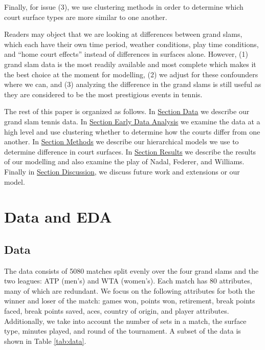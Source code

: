 \documentclass[]{article}
\begin{document}
Finally, for issue (3), we use clustering methods in order to determine
which court surface types are more similar to one another.

Readers may object that we are looking at differences between grand
slams, which each have their own time period, weather conditions, play
time conditions, and ``home court effects'' instead of differences in
surfaces alone. However, (1) grand slam data is the most readily
available and most complete which makes it the best choice at the moment
for modelling, (2) we adjust for these confounders where we can, and (3)
analyzing the difference in the grand slams is still useful as they are
considered to be the most prestigious events in tennis.

The rest of this paper is organized as follows. In
\protect\hyperlink{sec:data}{Section Data} we describe our grand slam
tennis data. In \protect\hyperlink{sec:eda}{Section Early Data Analysis}
we examine the data at a high level and use clustering whether to
determine how the courts differ from one another. In
\protect\hyperlink{sec:methods}{Section Methods} we describe our
hierarchical models we use to determine difference in court surfaces. In
\protect\hyperlink{sec:results}{Section Results} we describe the results
of our modelling and also examine the play of Nadal, Federer, and
Williams. Finally in \protect\hyperlink{discussion}{Section Discussion},
we discuss future work and extensions or our model.

\hypertarget{sec:data-eda}{%
\section{Data and EDA}\label{sec:data-eda}}

\hypertarget{sec:data}{%
\subsection{Data}\label{sec:data}}

The data consists of 5080 matches split evenly over the four grand slams
and the two leagues: ATP (men's) and WTA (women's). Each match has 80
attributes, many of which are redundant. We focus on the following
attributes for both the winner and loser of the match: games won, points
won, retirement, break points faced, break points saved, aces, country
of origin, and player attributes. Additionally, we take into account the
number of sets in a match, the surface type, minutes played, and round
of the tournament. A subset of the data is shown in Table
\ref{tab:data}.
\end{document}
